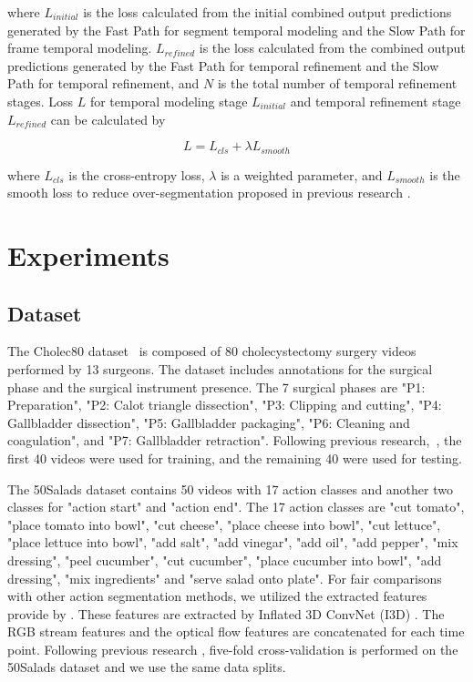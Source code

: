 \documentclass[sn-mathphys,Numbered]{sn-jnl}
\theoremstyle{thmstyleone}\newtheorem{theorem}{Theorem}\newtheorem{proposition}[theorem]{Proposition}
\theoremstyle{thmstyletwo}\newtheorem{example}{Example}\newtheorem{remark}{Remark}
\theoremstyle{thmstylethree}\newtheorem{definition}{Definition}
\begin{document}
where $L_{initial}$ is the loss calculated from the initial combined output predictions generated by the Fast Path for segment temporal modeling and the Slow Path for frame temporal modeling. $L_{refined}$ is the loss calculated from the combined output predictions generated by the Fast Path for temporal refinement and the Slow Path for temporal refinement, and $N$ is the total number of temporal refinement stages. Loss $L$ for temporal modeling stage $L_{initial}$ and temporal refinement stage $L_{refined}$ can be calculated by

\begin{equation}
L = L_{cls} + \lambda L_{smooth}
\end{equation}

where $L_{cls}$ is the cross-entropy loss, $\lambda$ is a weighted parameter, and $L_{smooth}$ is the smooth loss to reduce over-segmentation proposed in previous research \cite{farha2019ms,li2020ms}.


\section{Experiments}
\subsection{Dataset}
The Cholec80 dataset~\cite{twinanda2016endonet} is composed of 80 cholecystectomy surgery videos performed by 13 surgeons. The dataset includes annotations for the surgical phase and the surgical instrument presence. The 7 surgical phases are "P1: Preparation", "P2: Calot triangle dissection", "P3: Clipping and cutting", "P4: Gallbladder dissection", "P5: Gallbladder packaging", "P6: Cleaning and coagulation", and "P7: Gallbladder retraction". Following previous research,~\cite{twinanda2016endonet,wang2022less,yi2022not}, the first 40 videos were used for training, and the remaining 40 were used for testing.

The 50Salads dataset \cite{stein2013combining} contains 50 videos with 17 action classes and another two classes for "action start" and "action end". The 17 action classes are "cut tomato", "place tomato into bowl", "cut cheese", "place cheese into bowl", "cut lettuce", "place lettuce into bowl", "add salt", "add vinegar", "add oil", "add pepper", "mix dressing", "peel cucumber", "cut cucumber", "place cucumber into bowl", "add dressing", "mix ingredients" and "serve salad onto plate". For fair comparisons with other action segmentation methods, we utilized the extracted features provide by \cite{farha2019ms}. These features are extracted by Inflated 3D ConvNet (I3D) \cite{carreira2017quo}. The RGB stream features and the optical flow features are concatenated for each time point. Following previous research \cite{farha2019ms,li2020ms,yi2021asformer,wang2022cross,park2022maximization,liu2023diffusion}, five-fold cross-validation is performed on the 50Salads dataset and we use the same data splits.
\end{document}
